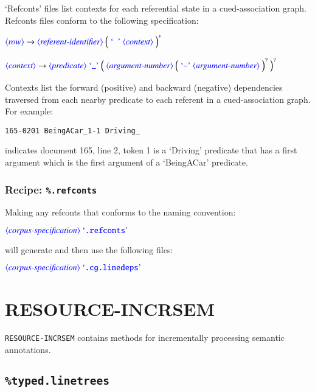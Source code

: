 \documentclass[12pt]{report}
\def\blue{\color{blue}}
\def\magenta{\color{magenta}}
\begin{document}
`Refconts' files list contexts for each referential state in a cued-association graph.
%
Refconts files conform to the following specification:

$\dtype{row} \rightarrow \dtype{referent-identifier} \ \Big( \ \dcode{\ } \ \dtype{context} \ \Big)^*$

$\dtype{context} \rightarrow \dtype{predicate} \ \dcode{\_} \ \Big( \ \dtype{argument-number} \ \Big( \ \dcode{-} \ \dtype{argument-number} \ \Big)^? \ \Big)^?$

Contexts list the forward (positive) and backward (negative) dependencies traversed from each nearby predicate to each referent in a cued-association graph.
%
For example:
%
{\magenta\begin{verbatim}
165-0201 BeingACar_1-1 Driving_
\end{verbatim}
}
%
indicates document 165, line 2, token 1 is a `Driving' predicate that has a first argument which is the first argument of a `BeingACar' predicate.

\subsection{Recipe: {\blue\tt \%.refconts}}

Making any refconts that conforms to the naming convention:

$\dtype{corpus-specification} \ \dcode{.refconts}$

will generate and then use the following files:

$\dtype{corpus-specification} \ \dcode{.cg.linedeps}$


\chapter{RESOURCE-INCRSEM}

{\tt RESOURCE-INCRSEM} contains methods for incrementally processing semantic annotations.

\section{{\blue\tt \%typed.linetrees}}
\end{document}
